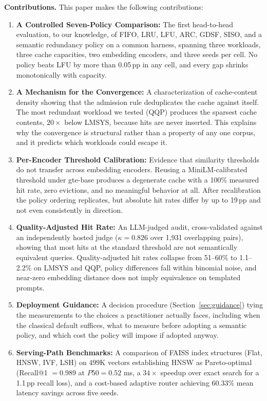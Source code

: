 \documentclass[sigconf,nonacm]{acmart}
\begin{document}
\textbf{Contributions.} This paper makes the following contributions:
\begin{enumerate}
\item \textbf{A Controlled Seven-Policy Comparison:} The first head-to-head evaluation, to our knowledge, of FIFO, LRU, LFU, ARC, GDSF, SISO, and a semantic redundancy policy on a common harness, spanning three workloads, three cache capacities, two embedding encoders, and three seeds per cell. No policy beats LFU by more than 0.05\,pp in any cell, and every gap shrinks monotonically with capacity.
\item \textbf{A Mechanism for the Convergence:} A characterization of cache-content density showing that the admission rule deduplicates the cache against itself. The most redundant workload we tested (QQP) produces the sparsest cache contents, $20\times$ below LMSYS, because hits are never inserted. This explains why the convergence is structural rather than a property of any one corpus, and it predicts which workloads could escape it.
\item \textbf{Per-Encoder Threshold Calibration:} Evidence that similarity thresholds do not transfer across embedding encoders. Reusing a MiniLM-calibrated threshold under gte-base produces a degenerate cache with a 100\% measured hit rate, zero evictions, and no meaningful behavior at all. After recalibration the policy ordering replicates, but absolute hit rates differ by up to 19\,pp and not even consistently in direction.
\item \textbf{Quality-Adjusted Hit Rate:} An LLM-judged audit, cross-validated against an independently hosted judge ($\kappa = 0.826$ over 1{,}931 overlapping pairs), showing that most hits at the standard threshold are not semantically equivalent queries. Quality-adjusted hit rates collapse from 51--60\% to 1.1--2.2\% on LMSYS and QQP, policy differences fall within binomial noise, and near-zero embedding distance does not imply equivalence on templated prompts.
\item \textbf{Deployment Guidance:} A decision procedure (Section~\ref{sec:guidance}) tying the measurements to the choices a practitioner actually faces, including when the classical default suffices, what to measure before adopting a semantic policy, and which cost the policy will impose if adopted anyway.
\item \textbf{Serving-Path Benchmarks:} A comparison of FAISS index structures (Flat, HNSW, IVF, LSH) on 499K vectors establishing HNSW as Pareto-optimal (Recall@1 $= 0.989$ at $P50 = 0.52$ ms, a $34\times$ speedup over exact search for a 1.1\,pp recall loss), and a cost-based adaptive router achieving 60.33\% mean latency savings across five seeds.
\end{enumerate}
\end{document}
